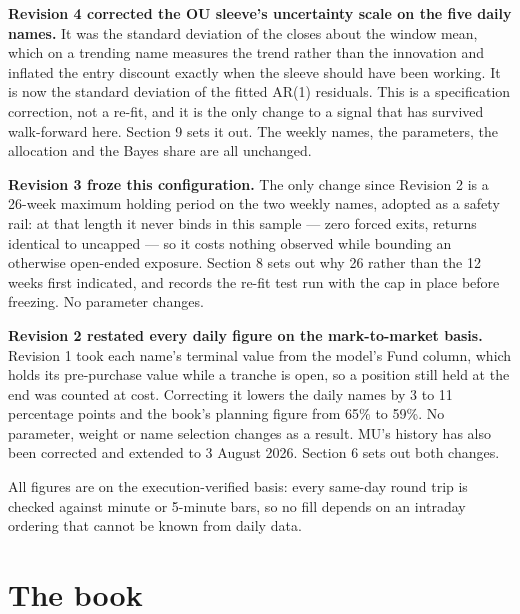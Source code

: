 \documentclass[11pt]{article}
\begin{document}
\begin{titlepage}
{{\textbf{Revision 4 corrected the OU sleeve's uncertainty scale on the five daily names.} It was
the standard deviation of the closes about the window mean, which on a trending name measures the
trend rather than the innovation and inflated the entry discount exactly when the sleeve should
have been working. It is now the standard deviation of the fitted AR(1) residuals. This is a
specification correction, not a re-fit, and it is the only change to a signal that has survived
walk-forward here. Section 9 sets it out. The weekly names, the parameters, the allocation and
the Bayes share are all unchanged.

\textbf{Revision 3 froze this configuration.} The only change since Revision 2 is a 26-week
maximum holding period on the two weekly names, adopted as a safety rail: at that length it never
binds in this sample --- zero forced exits, returns identical to uncapped --- so it costs nothing
observed while bounding an otherwise open-ended exposure. Section 8 sets out why 26 rather than
the 12 weeks first indicated, and records the re-fit test run with the cap in place before
freezing. No parameter changes.

\textbf{Revision 2 restated every daily figure on the mark-to-market basis.} Revision 1 took each
name's terminal value from the model's Fund column, which holds its pre-purchase value while a
tranche is open, so a position still held at the end was counted at cost. Correcting it lowers
the daily names by 3 to 11 percentage points and the book's planning figure from 65\% to 59\%.
No parameter, weight or name selection changes as a result. MU's history has also been corrected
and extended to 3 August 2026. Section 6 sets out both changes.

All figures are on the execution-verified basis: every same-day round trip is checked against
minute or 5-minute bars, so no fill depends on an intraday ordering that cannot be known from
daily data.}}
\end{titlepage}

\section{The book}
\end{document}
